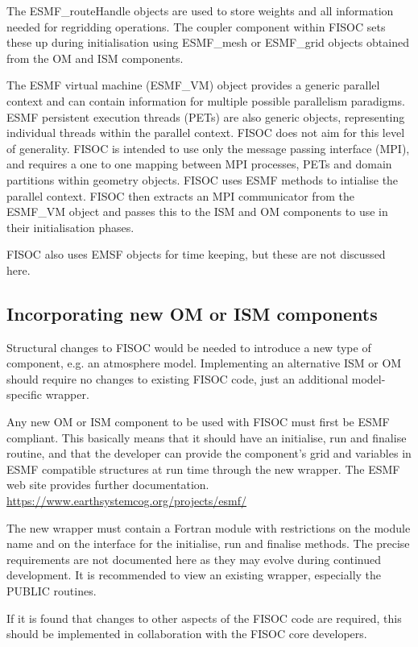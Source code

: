 \documentclass[11pt]{article}
\begin{document}
The ESMF\_routeHandle objects are used to store weights and all information
needed for regridding
operations. 
The coupler component within FISOC sets these up during initialisation using
ESMF\_mesh or ESMF\_grid objects obtained from the OM and ISM components. 

The ESMF virtual machine (ESMF\_VM) object provides a generic parallel context
and can contain information for multiple possible parallelism paradigms.
ESMF persistent execution threads (PETs) are also generic objects, representing
individual threads within the parallel context.
FISOC does not aim for this level of generality.
FISOC is intended to use only the message passing interface (MPI), and
requires a one to one mapping between MPI processes, PETs and domain partitions
within geometry objects. 
FISOC uses ESMF methods to intialise the parallel context.
FISOC then extracts an MPI communicator from the ESMF\_VM object and passes this to the
ISM and OM components to use in their initialisation phases.

FISOC also uses EMSF objects for time keeping, but these are not discussed here.



\subsection{Incorporating new OM or ISM components}

Structural changes to FISOC would be needed to introduce a new type 
of component, e.g. an atmosphere model.
Implementing an alternative ISM or OM should require no changes 
to existing FISOC code, just an additional model-specific wrapper.

Any new OM or ISM component to be used with FISOC must first be ESMF compliant.  This basically 
means that it should have an initialise, run and finalise routine, and that the developer can 
provide the component's grid and variables in ESMF compatible structures at run
time through the new wrapper.
The ESMF web site provides further documentation.
\url{https://www.earthsystemcog.org/projects/esmf/}


The new wrapper must contain a Fortran module with restrictions on the module name 
and on the  interface for the initialise, run and finalise methods. 
The precise requirements are not documented here as they may evolve 
during continued development.  
It is recommended to view an existing wrapper, especially the 
PUBLIC routines.

If it is found that changes to other aspects of the FISOC code are required, this should be 
implemented in collaboration with the FISOC core developers.
\end{document}
